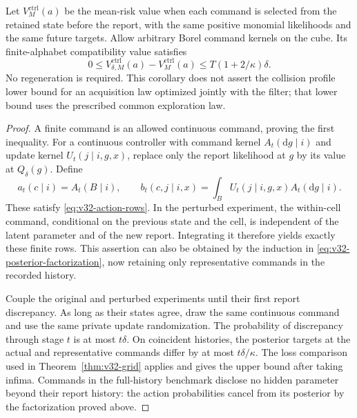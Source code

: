 \begin{corollary}
\label{cor:v32-controlled}
Let $V^{\mathrm{ctrl}}_M(a)$ be the mean-risk value when each command is
selected from the retained state before the report, with the same positive
monomial likelihoods and the same future targets. Allow arbitrary Borel
command kernels on the cube. Its finite-alphabet compatibility value
satisfies
\begin{equation}\label{eq:v32-controlled-grid}
 0\le V^{\mathrm{ctrl}}_{\delta,M}(a)
                  -V^{\mathrm{ctrl}}_M(a)
       \le T(1+2/\kappa)\delta.
\end{equation}
No regeneration is required. This corollary does not assert the collision
profile lower bound for an acquisition law optimized jointly with the
filter; that lower bound uses the prescribed common exploration law.
\end{corollary}
\begin{proof}
A finite command is an allowed continuous command, proving the first
inequality. For a continuous controller with command kernel
$A_t(\mathrm dg\mid i)$ and update kernel $U_t(j\mid i,g,x)$, replace
only the report likelihood at $g$ by its value at $Q_\delta(g)$. Define
\[
 a_t(c\mid i)=A_t(B\mid i),\qquad
 b_t(c,j\mid i,x)=\int_B U_t(j\mid i,g,x)A_t(\mathrm dg\mid i).
\]
These satisfy \eqref{eq:v32-action-rows}. In the perturbed experiment,
the within-cell command, conditional on the previous state and the cell,
is independent of the latent parameter and of the new report. Integrating
it therefore yields exactly these finite rows. This assertion can also
be obtained by the induction in \eqref{eq:v32-posterior-factorization},
now retaining only representative commands in the recorded history.

Couple the original and perturbed experiments until their first report
discrepancy. As long as their states agree, draw the same continuous
command and use the same private update randomization. The probability
of discrepancy through stage $t$ is at most $t\delta$. On coincident
histories, the posterior targets at the actual and representative commands
differ by at most $t\delta/\kappa$. The loss comparison used in
Theorem~\ref{thm:v32-grid} applies and gives the upper bound after taking
infima. Commands in the full-history benchmark disclose no hidden
parameter beyond their report history: the action probabilities cancel
from its posterior by the factorization proved above.
\end{proof}

